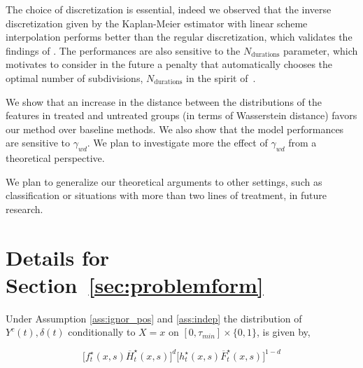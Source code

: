 \documentclass[12pt]{article}
\theoremstyle{plain}
\theoremstyle{definition}
\theoremstyle{remark}
\begin{document}
The choice of discretization is essential, indeed we observed that the inverse discretization given by the Kaplan-Meier estimator with linear scheme interpolation performs better than the regular discretization, which validates the findings of \cite{kvamme2019continuous}. The performances are also sensitive to the $N_{\text{durations}}$ parameter, which motivates to consider in the future a penalty that automatically chooses the optimal number of subdivisions, $N_{\text{durations}}$ in the spirit of~\cite{cottin2021idnetwork}.  

We show that an increase in the distance between the distributions of the features in treated and untreated groups (in terms of Wasserstein distance) favors our method over baseline methods. We also show that the model performances are sensitive to $\gamma_{wd}$. We plan to investigate more the effect of $\gamma_{wd}$ from a theoretical perspective.

We plan to generalize our theoretical arguments to other settings, such as classification or situations with more than two lines of treatment, in future research.




  
  



\newpage
\appendix
\onecolumn


\section{Details for Section~\ref{sec:problemform}}\label{app:sec3}
Under Assumption \ref{ass:ignor_pos} and \ref{ass:indep} the distribution of $Y^c(t), \delta(t)$ conditionally to $X=x$  on $[0,\tau _{min}] \times \{0,1\}$, is given by,
 
\begin{equation}
\Big[ f^{\star}_{t}( x,s)\overline{H}^{\star}_{t}( x,s)\Big]^{d }\Big[ h^{\star}_{t}( x,s)\overline{F}^{\star}_{t}( x,s)\Big]^{1-d }
\end{equation}
\end{document}
